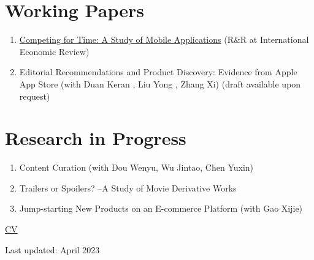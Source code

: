 \documentclass[11pt]{article}
\begin{document}
\section{Working Papers}
\label{sec:orgb967fe0}
\begin{enumerate}
\item \href{./files/competing\_for\_time\_Han.pdf}{Competing for Time: A Study of Mobile Applications} (R\&R at International Economic Review)
\item Editorial Recommendations and Product Discovery: Evidence from Apple App Store (with Duan Keran , Liu Yong , Zhang Xi) (draft available upon request)
\end{enumerate}

\section{Research in Progress}
\label{sec:org5fb79f5}
\begin{enumerate}
\item Content Curation (with Dou Wenyu, Wu Jintao, Chen Yuxin)
\item Trailers or Spoilers? --A Study of Movie Derivative Works
\item Jump-starting New Products on an E-commerce Platform (with Gao Xijie)
\end{enumerate}

\href{./files/cv\_2023.pdf}{CV}

Last updated: April 2023
\end{document}
